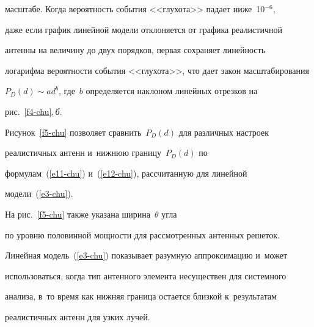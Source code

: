 масштабе. Когда вероятность события <<глухота>> падает ниже~10$^{-6}$, 


даже если график линейной модели отклоняется от графика реалистичной 


антенны на величину до двух порядков, первая сохраняет линейность 


логарифма вероятности события <<глухота>>, что дает закон масштабирования 


$P_D(d)\sim ad^b$, где~$b$ определяется наклоном линейных отрезков на 


рис.~\ref{f4-chu},\,\textit{б}.


  


  Рисунок~\ref{f5-chu} позволяет сравнить~$P_D(d)$ для различных настроек 


реалистичных антенн и~нижнюю границу~$P_D(d)$ по  


формулам~(\ref{e11-chu}) и~(\ref{e12-chu}), рассчитанную для линейной 


модели~(\ref{e3-chu}). 





На рис.~\ref{f5-chu} также указана ширина~$\theta$ угла 


по уровню половинной мощности для рассмотренных антенных решеток. 


Линейная модель~(\ref{e3-chu}) показывает разумную аппроксимацию и~может 


использоваться, когда тип антенного элемента несуществен для системного 


анализа, в~то время как нижняя граница остается близкой к~результатам 


реалистичных антенн для узких лучей. 











